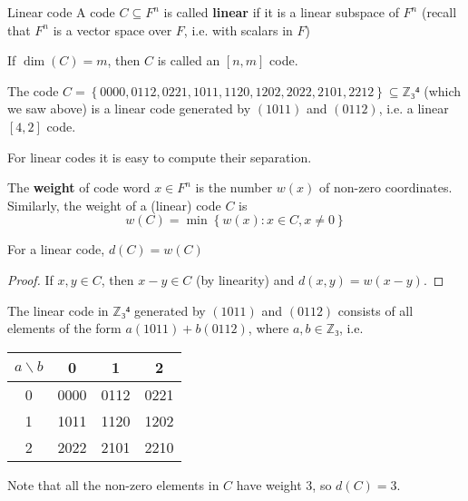 \documentclass[english]{lbscript}
\begin{document}
\begin{definition}{Linear code}{}
  A code \(C⊆F^{n}\) is called \textbf{linear} if it is a linear subspace of \(F^{n}\) (recall that \(F^{n}\) is a vector space over \(F\), i.e. with scalars in \(F\))

  If \(\dim(C)=m\), then \(C\) is called an \([n, m]\) code.
\end{definition}

\begin{example}{}{}
  The code \(C=\left\{ 0000, 0112, 0221, 1011, 1120, 1202, 2022, 2101, 2212 \right\} ⊆ ℤ₃⁴\) (which we saw above) is a linear code generated by \((1011)\) and \((0112)\), i.e. a linear \([4,2]\) code.
\end{example}

For linear codes it is easy to compute their separation.

\begin{definition}{}{}
  The \textbf{weight} of code word \(x∈F^{n}\) is the number \(w(x)\) of non-zero coordinates. Similarly, the weight of a (linear) code \(C\) is
  \begin{equation}
    \label{eq:138}
    w(C) = \min\left\{ w(x): x∈C, x≠0 \right\}
  \end{equation}
\end{definition}
\begin{theorem}{}{}
  For a linear code, \(d(C)=w(C)\)
\end{theorem}
\begin{proof}
  If \(x,y∈C\), then \(x-y∈C\) (by linearity) and \(d(x,y)=w(x-y)\).
\end{proof}

\begin{example}{}{}
  The linear code in \(ℤ₃⁴\) generated by \((1011)\) and \((0112)\) consists of all elements of the form \(a(1011)+b(0112)\), where \(a,b∈ℤ₃\), i.e.\\
  \begin{tabular}{c|ccc}
    \toprule
    \(a \backslash b\) & 0    & 1    & 2    \\
    \midrule
    0                  & 0000 & 0112 & 0221 \\
    1                  & 1011 & 1120 & 1202 \\
    2                  & 2022 & 2101 & 2210 \\
    \bottomrule
  \end{tabular}
  Note that all the non-zero elements in \(C\) have weight 3, so \(d(C)=3\).
\end{example}
\end{document}
